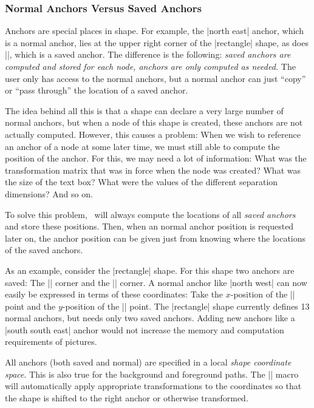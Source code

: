 \subsubsection{Normal Anchors Versus Saved Anchors}

Anchors  are special places in shape. For example, the |north east|
anchor, which is a normal anchor, lies at the upper right corner of
the  |rectangle| shape, as does |\northeast|, which is a saved
anchor. The difference is the following: \emph{saved anchors are 
  computed and stored for each node, anchors are only computed as
  needed.} The user only has access to the normal anchors, but a
normal anchor can just ``copy'' or ``pass through'' the location of a
saved anchor. 

The idea behind all this is that a shape can declare a very large
number of normal anchors, but when a node of this shape is created,
these anchors are not actually computed. However, this causes a
problem: When we wish to reference an anchor of a node at some later
time, we must still able to compute the position of the anchor. For 
this, we may need a lot of information: What was the transformation
matrix that was in force when the node was created? What was the size
of the text box? What were the values of the different separation
dimensions? And so on. 

To solve this problem, \pgfname\ will always compute the locations of
all \emph{saved anchors} and store these positions. Then, when an
normal anchor position is requested later on, the anchor position can
be given just from knowing where the locations of the saved anchors.

As an example, consider the |rectangle| shape. For this shape two
anchors are saved: The |\northeast| corner and the |\southwest|
corner. A normal anchor like |north west| can now easily be expressed
in terms of these coordinates: Take the $x$-position of the
|\southwest| point  and the $y$-position of the |\northeast| point. 
The |rectangle| shape currently defines 13 normal anchors, but needs
only two saved anchors. Adding new anchors like a  |south south east|
anchor would not increase the memory and computation requirements of
pictures. 

All anchors (both saved and normal) are specified in a local
\emph{shape coordinate space}. This is also true for the background
and foreground paths. The |\pgfnode| macro will automatically apply
appropriate transformations to the coordinates so that the shape is
shifted to the right anchor or otherwise transformed. 


